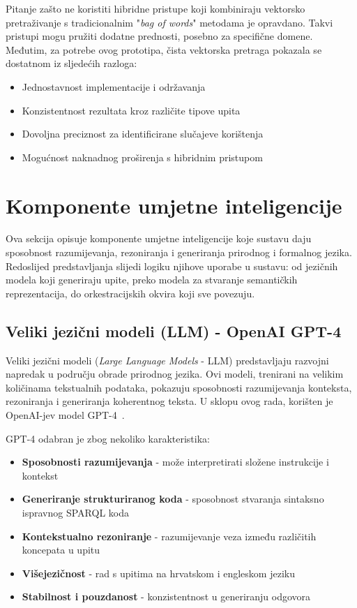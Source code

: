 Pitanje zašto ne koristiti hibridne pristupe koji kombiniraju vektorsko pretraživanje s tradicionalnim "\textit{bag of words}" metodama je opravdano. Takvi pristupi mogu pružiti dodatne prednosti, posebno za specifične domene. Međutim, za potrebe ovog prototipa, čista vektorska pretraga pokazala se dostatnom iz sljedećih razloga:

\begin{itemize}
    \item Jednostavnost implementacije i održavanja
    \item Konzistentnost rezultata kroz različite tipove upita
    \item Dovoljna preciznost za identificirane slučajeve korištenja
    \item Mogućnost naknadnog proširenja s hibridnim pristupom
\end{itemize}

\section{Komponente umjetne inteligencije}

Ova sekcija opisuje komponente umjetne inteligencije koje sustavu daju sposobnost razumijevanja, rezoniranja i generiranja prirodnog i formalnog jezika. Redoslijed predstavljanja slijedi logiku njihove uporabe u sustavu: od jezičnih modela koji generiraju upite, preko modela za stvaranje semantičkih reprezentacija, do orkestracijskih okvira koji sve povezuju.

\subsection{Veliki jezični modeli (LLM) - OpenAI GPT-4}

Veliki jezični modeli (\textit{Large Language Models} - LLM) predstavljaju razvojni napredak u području obrade prirodnog jezika. Ovi modeli, trenirani na velikim količinama tekstualnih podataka, pokazuju sposobnosti razumijevanja konteksta, rezoniranja i generiranja koherentnog teksta. U sklopu ovog rada, korišten je OpenAI-jev model GPT-4~\cite{openai2023gpt4}.

GPT-4 odabran je zbog nekoliko karakteristika:

\begin{itemize}
    \item \textbf{Sposobnosti razumijevanja} - može interpretirati složene instrukcije i kontekst
    \item \textbf{Generiranje strukturiranog koda} - sposobnost stvaranja sintaksno ispravnog SPARQL koda
    \item \textbf{Kontekstualno rezoniranje} - razumijevanje veza između različitih koncepata u upitu
    \item \textbf{Višejezičnost} - rad s upitima na hrvatskom i engleskom jeziku
    \item \textbf{Stabilnost i pouzdanost} - konzistentnost u generiranju odgovora
\end{itemize}

